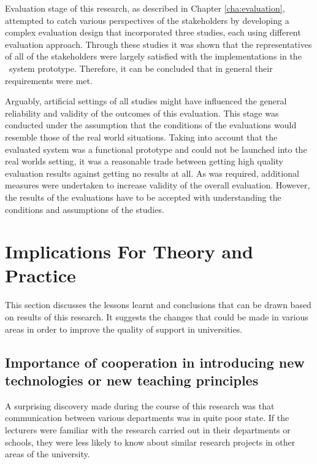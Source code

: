 
Evaluation stage of this research, as described in Chapter \ref{cha:evaluation},
attempted to catch various perspectives of the stakeholders by developing a
complex evaluation design that incorporated three studies, each using different
evaluation approach. Through these studies it was shown that the representatives
of all of the stakeholders were largely satisfied with the implementations in
the \ep~system prototype. Therefore, it can be concluded that in general their
requirements were met.

Arguably, artificial settings of all studies might have influenced the general
reliability and validity of the outcomes of this evaluation. This stage was
conducted under the assumption that the conditions of the evaluations would
resemble those of the real world situations. Taking into account that the
evaluated system was a functional prototype and could not be launched into the
real worlds setting, it was a reasonable trade between getting high quality
evaluation results against getting no results at all. As was required,
additional measures were undertaken to increase validity of the overall
evaluation. However, the results of the evaluations have to be accepted with
understanding the conditions and assumptions of the studies.

\section{Implications For Theory and Practice}

This section discusses the lessons learnt and conclusions that can be drawn
based on results of this research. It suggests the changes that could be made in
various areas in order to improve the quality of \LLLs support in universities.

\subsection[Cooperation and Communication]{Importance of cooperation in 
introducing new technologies or new teaching principles}

A surprising discovery made during the course of this research was that
communication between various departments was in quite poor state. If the
lecturers were familiar with the research carried out in their departments or
schools, they were less likely to know about similar research projects in other
areas of the university. 

